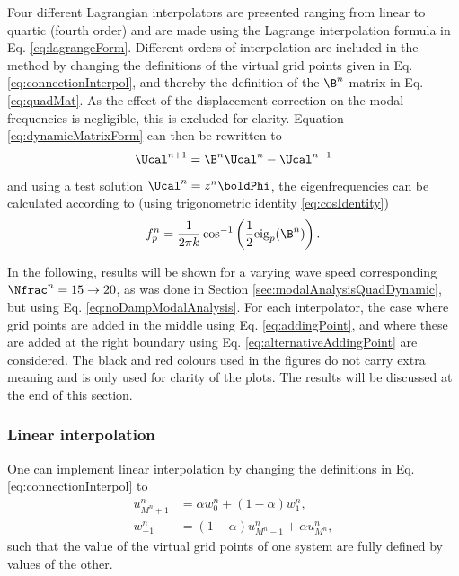 Four different Lagrangian interpolators are presented ranging from linear to quartic (fourth order) and are made using the Lagrange interpolation formula in Eq. \eqref{eq:lagrangeForm}. Different orders of interpolation are included in the method by changing the definitions of the virtual grid points given in Eq. \eqref{eq:connectionInterpol}, and thereby the definition of the $\B^n$ matrix in Eq. \eqref{eq:quadMat}. As the effect of the displacement correction on the modal frequencies is negligible, this is excluded for clarity. Equation \eqref{eq:dynamicMatrixForm} can then be rewritten to 
\begin{equation}
    \Ucal^{n+1} = \B^n \Ucal^n- \Ucal^{n-1}
\end{equation}
and using a test solution $\Ucal^n = z^n\boldPhi$, the eigenfrequencies can be calculated according to (using trigonometric identity \eqref{eq:cosIdentity})
\begin{equation}\label{eq:noDampModalAnalysis}
    f_p^n = \frac{1}{2 \pi k}\cos^{-1}\left(\frac{1}{2}\text{eig}_p(\B^n)\right).
\end{equation}

In the following, results will be shown for a varying wave speed corresponding $\Nfrac^n = 15 \rightarrow 20$, as was done in Section \ref{sec:modalAnalysisQuadDynamic}, but using Eq. \eqref{eq:noDampModalAnalysis}. For each interpolator, the case where grid points are added in the middle using Eq. \eqref{eq:addingPoint}, and where these are added at the right boundary using Eq. \eqref{eq:alternativeAddingPoint} are considered. The black and red colours used in the figures do not carry extra meaning and is only used for clarity of the plots. The results will be discussed at the end of this section. 
 
\subsubsection{Linear interpolation}
One can implement linear interpolation by changing the definitions in Eq. \eqref{eq:connectionInterpol} to
\begin{subequations}\label{eq:linearConnInterpol}
    \begin{align}
            u_{M^n+1}^n &= \alpha w_0^n + (1-\alpha)w_1^n,\label{eq:linearVirtU}\\
            w_{-1}^n &= (1-\alpha)u_{M^n-1}^n + \alpha u_{M^n}^n,
    \end{align}
\end{subequations}
such that the value of the virtual grid points of one system are fully defined by values of the other. 

